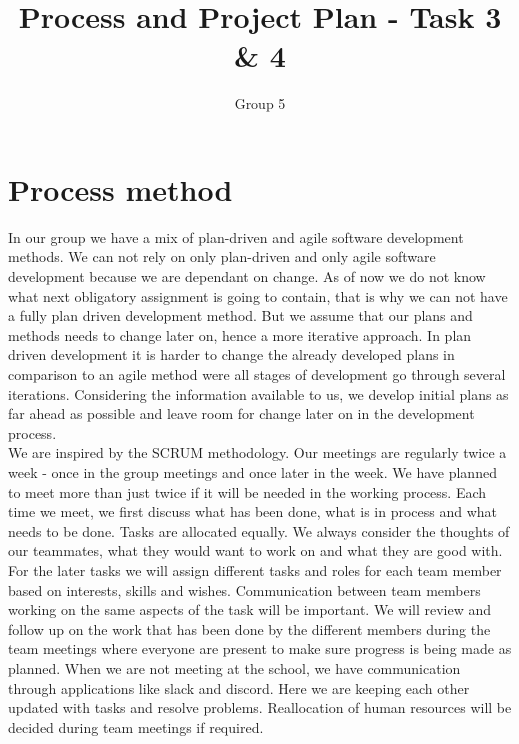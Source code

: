 \documentclass{article}
\title{Process and Project Plan - Task 3 \& 4}
\author{Group 5}
\date{}
\begin{document}
    \maketitle
    
    \section{Process method}
    \noindent
    In our group we have a mix of plan-driven and agile software development methods. We can not rely on only plan-driven and only agile software development because we are dependant on change. As of now we do not know what next obligatory assignment is going to contain, that is why we can not have a fully plan driven development method. But we assume that our plans and methods needs to change later on, hence a more iterative approach. In plan driven development it is harder to change the already developed plans in comparison to an agile method were all stages of development go through several iterations. Considering the information available to us, we develop initial plans as far ahead as possible and leave room for change later on in the development process. \\

    \noindent
    We are inspired by the SCRUM methodology. Our meetings are regularly twice a week - once in the group meetings and once later in the week. We have planned to meet more than just twice if it will be needed in the working process. Each time we meet, we first discuss what has been done, what is in process and what needs to be done. Tasks are allocated equally. We always consider the thoughts of our teammates, what they would want to work on and what they are good with. \\
    
    \noindent
    For the later tasks we will assign different tasks and roles for each team member based on interests, skills and wishes. Communication between team members working on the same aspects of the task will be important. We will review and follow up on the work that has been done by the different members during the team meetings where everyone are present to make sure progress is being made as planned. When we are not meeting at the school, we have communication through applications like slack and discord. Here we are keeping each other updated with tasks and resolve problems. Reallocation of human resources will be decided during team meetings if required. 

    
\end{document}
